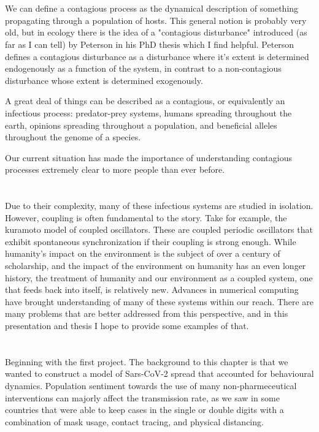 \documentclass{article}
\begin{document}
\section{}

We can define a contagious process as the dynamical description of something propagating through a population of hosts. This general notion is probably very old, but in ecology there is the idea of a "contagious disturbance" introduced (as far as I can tell) by Peterson in his PhD thesis which I find helpful. Peterson defines a contagious disturbance as a disturbance where it's extent is determined endogenously as a function of the system, in contrast to a non-contagious disturbance whose extent is determined exogenously.

A great deal of things can be described as a contagious, or equivalently an infectious process: predator-prey systems, humans spreading throughout the earth, opinions spreading throughout a population, and beneficial alleles throughout the genome of a species.

Our current situation has made the importance of understanding contagious processes extremely clear to more people than ever before.

\section{}
Due to their complexity, many of these infectious systems are studied in isolation. However, coupling is often fundamental to the story. Take for example, the kuramoto model of coupled oscillators. These are coupled periodic oscillators that exhibit spontaneous synchronization if their coupling is strong enough. While humanity's impact on the environment is the subject of over a century of scholarship, and the impact of the environment on humanity has an even longer history, the treatment of humanity and our environment as a coupled system, one that feeds back into itself, is relatively new. Advances in numerical computing have brought understanding of many of these systems within our reach. There are many problems that are better addressed from this perspective, and in this presentation and thesis I hope to provide some examples of that. 

\section{}
Beginning with the first project. The background to this chapter is that we wanted to construct a model of Sars-CoV-2 spread that accounted for behavioural dynamics. Population sentiment towards the use of many non-pharmeceutical interventions can majorly affect the transmission rate, as we saw in some countries that were able to keep cases in the single or double digits with a combination of mask usage, contact tracing, and physical distancing.
\end{document}
